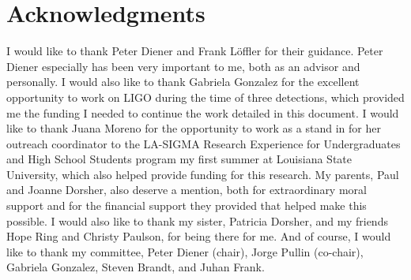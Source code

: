 \documentclass[12pt,letterpaper]{lsuetd}
\begin{document}

\chapter*{Acknowledgments}
\doublespacing
\vspace{0.55ex}
I would like to thank Peter Diener and Frank L\"{o}ffler for their guidance. Peter Diener especially has been very important to me, both as an advisor and personally. I would also like to thank Gabriela Gonzalez for the excellent opportunity to work on LIGO during the time of three detections, which provided me the funding I needed to continue the work detailed in this document. I would like to thank Juana Moreno for the opportunity to work as a stand in for her outreach coordinator to the LA-SIGMA Research Experience for Undergraduates and High School Students program my first summer at Louisiana State University, which also helped provide funding for this research. My parents, Paul and Joanne Dorsher, also deserve a mention, both for extraordinary moral support and for the financial support they provided that helped make this possible. I would also like to thank my sister, Patricia Dorsher, and my friends Hope Ring and Christy Paulson, for being there for me. And of course, I would like to thank my committee, Peter Diener (chair), Jorge Pullin (co-chair), Gabriela Gonzalez, Steven Brandt, and Juhan Frank. 

\pagebreak

\end{document}
